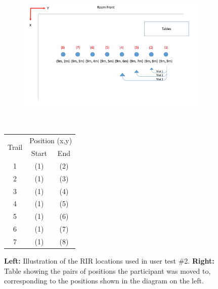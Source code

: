 \documentclass[../../main.tex]{subfiles}
\begin{document}
			\begin{figure}[H]
				\begin{minipage}{0.5\textwidth}
					\begin{figure}[H]
					\hspace{0mm}\includegraphics[scale = 0.3]{Sections/userTesting/images/test2/test2Positions2.png}
					\end{figure}			
				\end{minipage}
				~
				\begin{minipage}{0.5\textwidth}
				    \hspace{35mm}\begin{tabular}{|c|c|c|} \hline
				        \multirow{2}{*}{Trail} & \multicolumn{2}{c|}{Position (x,y)} \\ \cline{2-3}
				             & Start & End \\ \hline
				          1 & (1) & (2) \\
				          2 & (1) & (3) \\
				          3 & (1) & (4) \\
				          4 & (1) & (5) \\
				          5 & (1) & (6) \\
				          6 & (1) & (7) \\
				          7 & (1) & (8) \\ \hline
				    \end{tabular}
			    \end{minipage}
			    \caption{\textbf{Left:} Illustration of the \ac{RIR} locations used in user test \#2. \textbf{Right:} Table showing the pairs of positions the participant was moved to, corresponding to the positions shown in the diagram on the left.}
				\label{test2}
			\end{figure}
\end{document}
